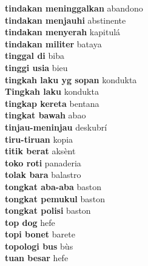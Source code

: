 \textbf{ tindakan meninggalkan  } abandono \\
\textbf{ tindakan menjauhi  } abstinente \\
\textbf{ tindakan menyerah  } kapitulá \\
\textbf{ tindakan militer  } bataya \\
\textbf{ tinggal di  } biba \\
\textbf{ tinggi usia  } bieu \\
\textbf{ tingkah laku yg sopan  } kondukta \\
\textbf{ Tingkah laku  } kondukta \\
\textbf{ tingkap kereta  } bentana \\
\textbf{ tingkat bawah  } abao \\
\textbf{ tinjau-meninjau  } deskubrí \\
\textbf{ tiru-tiruan  } kopia \\
\textbf{ titik berat  } aksènt \\
\textbf{ toko roti  } panaderia \\
\textbf{ tolak bara  } balastro \\
\textbf{ tongkat aba-aba  } baston \\
\textbf{ tongkat pemukul  } baston \\
\textbf{ tongkat polisi  } baston \\
\textbf{ top dog  } hefe \\
\textbf{ topi bonet  } barete \\
\textbf{ topologi bus  } bùs \\
\textbf{ tuan besar  } hefe \\
